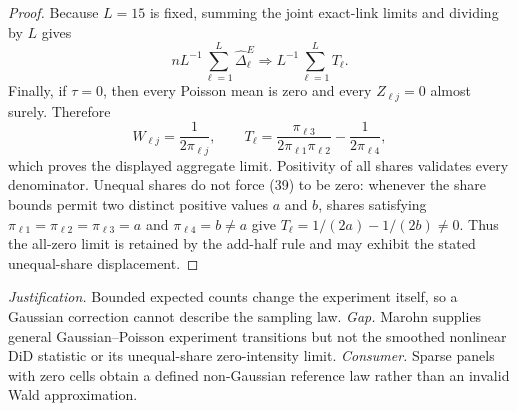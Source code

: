 \documentclass{article}
\begin{document}
\begin{proof}
Because \(L=15\) is fixed, summing the joint exact-link limits and dividing by \(L\) gives
\[
nL^{-1}\sum_{\ell=1}^{L}\widehat\Delta^E_{\ell}
\Rightarrow L^{-1}\sum_{\ell=1}^{L}T_{\ell}.
\tag{38}
\]
Finally, if \(\tau=0\), then every Poisson mean is zero and every \(Z_{\ell j}=0\) almost surely.  Therefore
\[
W_{\ell j}=\frac1{2\pi_{\ell j}},
\qquad
T_{\ell}
=\frac{\pi_{\ell3}}{2\pi_{\ell1}\pi_{\ell2}}
-\frac1{2\pi_{\ell4}},
\tag{39}
\]
which proves the displayed aggregate limit.  Positivity of all shares validates every denominator.  Unequal shares do not force (39) to be zero: whenever the share bounds permit two distinct positive values \(a\) and \(b\), shares satisfying \(\pi_{\ell1}=\pi_{\ell2}=\pi_{\ell3}=a\) and \(\pi_{\ell4}=b\neq a\) give \(T_{\ell}=1/(2a)-1/(2b)\neq0\).  Thus the all-zero limit is retained by the add-half rule and may exhibit the stated unequal-share displacement.
\end{proof}
\par\smallskip\noindent \textit{Justification.} Bounded expected counts change the experiment itself, so a Gaussian correction cannot describe the sampling law. \textit{Gap.} Marohn supplies general Gaussian--Poisson experiment transitions but not the smoothed nonlinear DiD statistic or its unequal-share zero-intensity limit. \textit{Consumer.} Sparse panels with zero cells obtain a defined non-Gaussian reference law rather than an invalid Wald approximation.
\end{document}
